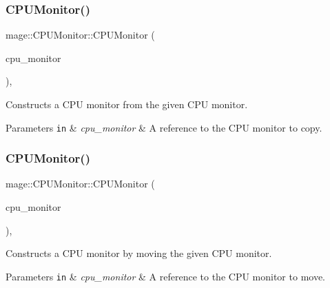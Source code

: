 \subsubsection{\texorpdfstring{C\+P\+U\+Monitor()}{CPUMonitor()}\hspace{0.1cm}{\footnotesize\ttfamily [2/3]}}
{\footnotesize\ttfamily mage\+::\+C\+P\+U\+Monitor\+::\+C\+P\+U\+Monitor (\begin{DoxyParamCaption}\item[{const \hyperlink{classmage_1_1_c_p_u_monitor}{C\+P\+U\+Monitor} \&}]{cpu\+\_\+monitor }\end{DoxyParamCaption})\hspace{0.3cm}{\ttfamily [default]}, {\ttfamily [noexcept]}}

Constructs a C\+PU monitor from the given C\+PU monitor.


\begin{DoxyParams}[1]{Parameters}
\mbox{\tt in}  & {\em cpu\+\_\+monitor} & A reference to the C\+PU monitor to copy. \\
\hline
\end{DoxyParams}
\hypertarget{classmage_1_1_c_p_u_monitor_a415f77c86323428f233f955249f5b252}{}\label{classmage_1_1_c_p_u_monitor_a415f77c86323428f233f955249f5b252} 
\subsubsection{\texorpdfstring{C\+P\+U\+Monitor()}{CPUMonitor()}\hspace{0.1cm}{\footnotesize\ttfamily [3/3]}}
{\footnotesize\ttfamily mage\+::\+C\+P\+U\+Monitor\+::\+C\+P\+U\+Monitor (\begin{DoxyParamCaption}\item[{\hyperlink{classmage_1_1_c_p_u_monitor}{C\+P\+U\+Monitor} \&\&}]{cpu\+\_\+monitor }\end{DoxyParamCaption})\hspace{0.3cm}{\ttfamily [default]}, {\ttfamily [noexcept]}}

Constructs a C\+PU monitor by moving the given C\+PU monitor.


\begin{DoxyParams}[1]{Parameters}
\mbox{\tt in}  & {\em cpu\+\_\+monitor} & A reference to the C\+PU monitor to move. \\
\hline
\end{DoxyParams}
\hypertarget{classmage_1_1_c_p_u_monitor_a597ea4b27675a22d3d66a1d817b26652}{}\label{classmage_1_1_c_p_u_monitor_a597ea4b27675a22d3d66a1d817b26652} 
